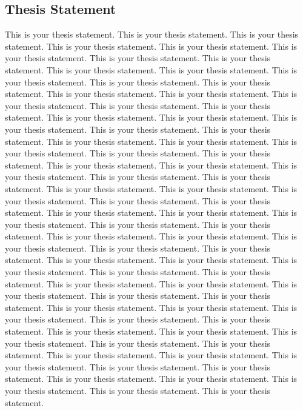 {
\begin{doublespacing}
\begin{flushleft}

\section{Thesis Statement}

This is your thesis statement. This is your thesis statement. This is your thesis statement. This is your thesis statement. This is your thesis statement. This is your thesis statement. This is your thesis statement. This is your thesis statement. This is your thesis statement. This is your thesis statement. This is your thesis statement. This is your thesis statement. This is your thesis statement. This is your thesis statement. This is your thesis statement. This is your thesis statement. This is your thesis statement. This is your thesis statement. This is your thesis statement. This is your thesis statement. This is your thesis statement. This is your thesis statement. This is your thesis statement. This is your thesis statement. This is your thesis statement. This is your thesis statement. This is your thesis statement. This is your thesis statement. This is your thesis statement. This is your thesis statement. This is your thesis statement. This is your thesis statement. This is your thesis statement. This is your thesis statement. This is your thesis statement. This is your thesis statement. This is your thesis statement. This is your thesis statement. This is your thesis statement. This is your thesis statement. This is your thesis statement. This is your thesis statement. This is your thesis statement. This is your thesis statement. This is your thesis statement. This is your thesis statement. This is your thesis statement. This is your thesis statement. This is your thesis statement. This is your thesis statement. This is your thesis statement. This is your thesis statement. This is your thesis statement. This is your thesis statement. This is your thesis statement. This is your thesis statement. This is your thesis statement. This is your thesis statement. This is your thesis statement. This is your thesis statement. This is your thesis statement. This is your thesis statement. This is your thesis statement. This is your thesis statement. This is your thesis statement. This is your thesis statement. This is your thesis statement. This is your thesis statement. This is your thesis statement. This is your thesis statement. This is your thesis statement. This is your thesis statement. This is your thesis statement. This is your thesis statement. This is your thesis statement. This is your thesis statement. This is your thesis statement. This is your thesis statement. 


\end{flushleft}
\end{doublespacing}
}